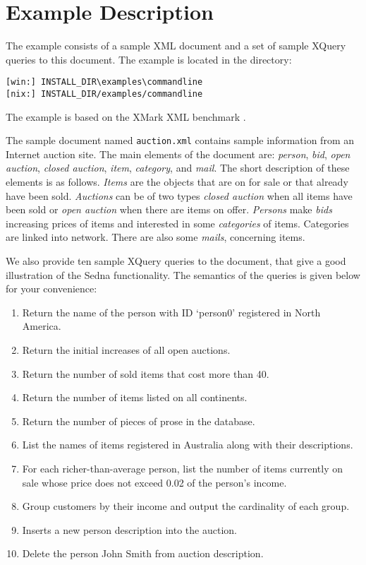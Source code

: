 \documentclass[a4paper,12pt]{article}
\begin{document}
\section{Example Description}
\label{sec:example-description}

The example consists of a sample XML document and a set of sample XQuery queries
to this document. The example is located in the directory:
\begin{verbatim}
[win:] INSTALL_DIR\examples\commandline
[nix:] INSTALL_DIR/examples/commandline
\end{verbatim}
The example is based on the XMark XML benchmark \cite{xmark}.

The sample document named \verb!auction.xml! contains sample information from an
Internet auction site. The main elements of the document are: \emph{person},
\emph{bid}, \emph{open auction}, \emph{closed auction}, \emph{item},
\emph{category}, and \emph{mail}. The short description of these elements is as
follows. \emph{Items} are the objects that are on for sale or that already have
been sold. \emph{Auctions} can be of two types \emph{closed auction} when all
items have been sold or \emph{open auction} when there are items on offer.
\emph{Persons} make \emph{bids} increasing prices of items and interested in
some \emph{categories} of items. Categories are linked into network. There are
also some \emph{mails}, concerning items.

We also provide ten sample XQuery queries to the document, that give a good
illustration of the Sedna functionality. The semantics of the queries is given
below for your convenience:

\begin{enumerate}
\item Return the name of the person with ID `person0' registered in North
 America.
\item Return the initial increases of all open auctions.
\item Return the number of sold items that cost more than 40.
\item Return the number of items listed on all continents.
\item Return the number of pieces of prose in the database.
\item List the names of items registered in Australia along with their
 descriptions.
\item For each richer-than-average person, list the number of items currently
 on sale whose price does not exceed 0.02 of the person's income.
\item Group customers by their income and output the cardinality of each group.
\item Inserts a new person description into the auction.
\item Delete the person John Smith from auction description.
\end{enumerate}
\end{document}
